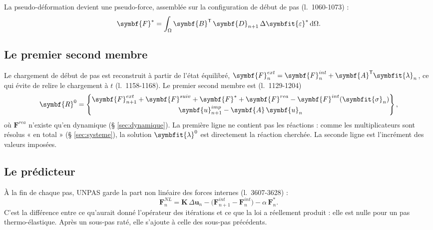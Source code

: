 \documentclass[11pt,a4paper]{article}
\numberwithin{equation}{section}
\newcommand{\pr}[1]{\textsf{#1}}                        %
\newcommand{\lig}[1]{l.~#1}
\newcommand{\vc}[1]{\symbf{#1}}                         %
\newcommand{\Deps}{\Delta\symbfit{\varepsilon}}
\newcommand{\sig}{\symbfit{\sigma}}
\newcommand{\vg}[1]{\symbfit{#1}}                       %
\begin{document}
La pseudo-déformation devient une pseudo-force, assemblée sur la configuration de début de pas (\lig{1060-1073}) :
\begin{equation}
\vc F^{*} = \int_\Omega \vc B^{\mathsf T}\,\vc D_{n+1}\,\Deps^{*}\,\mathrm d\Omega .
\end{equation}

\subsection{Le premier second membre}

Le chargement de début de pas est reconstruit à partir de l'état équilibré, $\vc F^{ext}_n = \vc F^{int}_n + \vc A^{\mathsf T}\vg\lambda_n$, ce qui évite de relire le chargement à $t$ (\lig{1158-1168}).
Le premier second membre est (\lig{1129-1204})
\begin{equation}
\label{eq:R0}
\vc R^{0} = \begin{Bmatrix}\vc F^{ext}_{n+1} + \vc F^{suiv} + \vc F^{*} + \vc F^{rea} - \vc F^{int}(\sig_n)\\[2pt] \vc u^{imp}_{n+1} - \vc A\,\vc u_n\end{Bmatrix},
\end{equation}
où $\vc F^{rea}$ n'existe qu'en dynamique (§ \ref{sec:dynamique}).
La première ligne ne contient pas les réactions : comme les multiplicateurs sont résolus « en total » (§ \ref{sec:systeme}), la solution $\vg\lambda^{0}$ est directement la réaction cherchée.
La seconde ligne est l'incrément des valeurs imposées.

\subsection{Le prédicteur}
\label{sec:predicteur}

À la fin de chaque pas, \pr{UNPAS} garde la part non linéaire des forces internes (\lig{3607-3628}) :
\begin{equation}
\vc F^{NL}_n = \vc K\,\Delta\vc u_n - \big(\vc F^{int}_{n+1} - \vc F^{int}_n\big) - \alpha\,\vc F^{*}_n .
\end{equation}
C'est la différence entre ce qu'aurait donné l'opérateur des itérations et ce que la loi a réellement produit : elle est nulle pour un pas thermo-élastique.
Après un sous-pas raté, elle s'ajoute à celle des sous-pas précédents.
\end{document}
